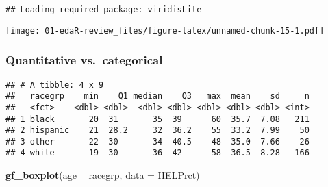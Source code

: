\documentclass[]{article}
\newenvironment{Shaded}{\begin{snugshade}}{\end{snugshade}}
\newcommand{\KeywordTok}[1]{\textcolor[rgb]{0.13,0.29,0.53}{\textbf{#1}}}
\newcommand{\DataTypeTok}[1]{\textcolor[rgb]{0.13,0.29,0.53}{#1}}
\newcommand{\DecValTok}[1]{\textcolor[rgb]{0.00,0.00,0.81}{#1}}
\newcommand{\StringTok}[1]{\textcolor[rgb]{0.31,0.60,0.02}{#1}}
\newcommand{\CommentTok}[1]{\textcolor[rgb]{0.56,0.35,0.01}{\textit{#1}}}
\newcommand{\OperatorTok}[1]{\textcolor[rgb]{0.81,0.36,0.00}{\textbf{#1}}}
\newcommand{\NormalTok}[1]{#1}
\begin{document}
\begin{verbatim}
## Loading required package: viridisLite
\end{verbatim}

\texttt{[image: 01-edaR-review\_files/figure-latex/unnamed-chunk-15-1.pdf]}

\subsubsection{Quantitative
vs.~categorical}\label{quantitative-vs.categorical}

\begin{Shaded}
\end{Shaded}

\begin{verbatim}
## # A tibble: 4 x 9
##   racegrp    min    Q1 median    Q3   max  mean    sd     n
##   <fct>    <dbl> <dbl>  <dbl> <dbl> <dbl> <dbl> <dbl> <int>
## 1 black       20  31       35  39      60  35.7  7.08   211
## 2 hispanic    21  28.2     32  36.2    55  33.2  7.99    50
## 3 other       22  30       34  40.5    48  35.0  7.66    26
## 4 white       19  30       36  42      58  36.5  8.28   166
\end{verbatim}

\begin{Shaded}
\begin{Highlighting}[]
\KeywordTok{gf_boxplot}\NormalTok{(age }\OperatorTok{~}\StringTok{ }\NormalTok{racegrp, }\DataTypeTok{data =}\NormalTok{ HELPrct)}
\end{Highlighting}
\end{Shaded}
\end{document}
